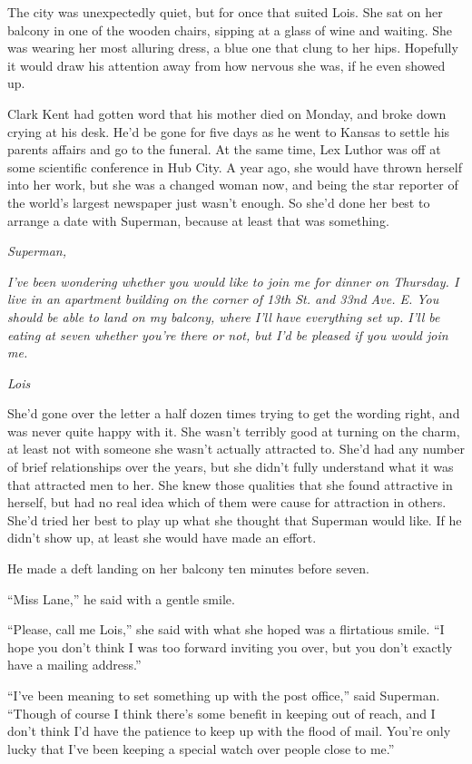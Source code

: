 \documentclass[ebook,12pt]{memoir}
\begin{document}
The city was unexpectedly quiet, but for once that suited Lois. She sat
on her balcony in one of the wooden chairs, sipping at a glass of wine
and waiting. She was wearing her most alluring dress, a blue one that
clung to her hips. Hopefully it would draw his attention away from how
nervous she was, if he even showed up.

Clark Kent had gotten word that his mother died on Monday, and broke
down crying at his desk. He'd be gone for five days as he went to Kansas
to settle his parents affairs and go to the funeral. At the same time,
Lex Luthor was off at some scientific conference in Hub City. A year
ago, she would have thrown herself into her work, but she was a changed
woman now, and being the star reporter of the world's largest newspaper
just wasn't enough. So she'd done her best to arrange a date with
Superman, because at least that was something.

\emph{Superman,}

\emph{I've been wondering whether you would like to join me for dinner
on Thursday. I live in an apartment building on the corner of 13th St.
and 33nd Ave. E. You should be able to land on my balcony, where I'll
have everything set up. I'll be eating at seven whether you're there or
not, but I'd be pleased if you would join me.}

\emph{Lois}

She'd gone over the letter a half dozen times trying to get the wording
right, and was never quite happy with it. She wasn't terribly good at
turning on the charm, at least not with someone she wasn't actually
attracted to. She'd had any number of brief relationships over the
years, but she didn't fully understand what it was that attracted men to
her. She knew those qualities that she found attractive in herself, but
had no real idea which of them were cause for attraction in others.
She'd tried her best to play up what she thought that Superman would
like. If he didn't show up, at least she would have made an effort.

He made a deft landing on her balcony ten minutes before seven.

``Miss Lane,'' he said with a gentle smile.

``Please, call me Lois,'' she said with what she hoped was a flirtatious
smile. ``I hope you don't think I was too forward inviting you over, but
you don't exactly have a mailing address.''

``I've been meaning to set something up with the post office,'' said
Superman. ``Though of course I think there's some benefit in keeping out
of reach, and I don't think I'd have the patience to keep up with the
flood of mail. You're only lucky that I've been keeping a special watch
over people close to me.''
\end{document}
